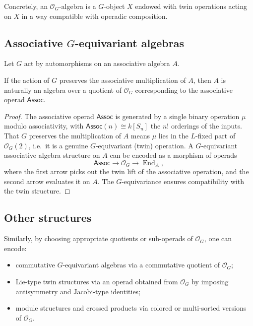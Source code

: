 \documentclass[11pt,a4paper]{article}
\numberwithin{equation}{section}
\DeclareMathOperator{\End}{End}
\newcommand{\LinearSubgroup}{L}
\begin{document}
	\begin{remark}
		Concretely, an $\mathcal{O}_G$-algebra is a $G$-object $X$ endowed with twin operations
		acting on $X$ in a way compatible with operadic composition.
	\end{remark}
	
	\subsection{Associative $G$-equivariant algebras}
	
	Let $G$ act by automorphisms on an associative algebra $A$.
	
	\begin{proposition}
		If the action of $G$ preserves the associative multiplication of $A$, then $A$ is naturally an
		algebra over a quotient of $\mathcal{O}_G$ corresponding to the associative operad $\mathsf{Assoc}$.
	\end{proposition}
	
	\begin{proof}
		The associative operad $\mathsf{Assoc}$ is generated by a single binary operation $\mu$ modulo
		associativity, with $\mathsf{Assoc}(n)\cong k[S_n]$ the $n!$ orderings of the inputs. That $G$ preserves the
		multiplication of $A$ means $\mu$ lies in the $\LinearSubgroup$-fixed part of $\mathcal{O}_G(2)$, i.e.\ it is
		a genuine $G$-equivariant (twin) operation. A $G$-equivariant associative algebra structure 
		on $A$ can be encoded as a morphism of operads
		\[
		\mathsf{Assoc}\to\mathcal{O}_G\to\End_A,
		\]
		where the first arrow picks out the twin lift of the associative operation, and the second arrow
		evaluates it on $A$. The $G$-equivariance ensures compatibility with the twin structure.
	\end{proof}
	
	\subsection{Other structures}
	
	Similarly, by choosing appropriate quotients or sub-operads of $\mathcal{O}_G$, one can encode:
	
	\begin{itemize}
		\item commutative $G$-equivariant algebras via a commutative quotient of $\mathcal{O}_G$;
		\item Lie-type twin structures via an operad obtained from $\mathcal{O}_G$ by imposing antisymmetry and Jacobi-type identities;
		\item module structures and crossed products via colored or multi-sorted versions of $\mathcal{O}_G$.
	\end{itemize}
	
\end{document}
